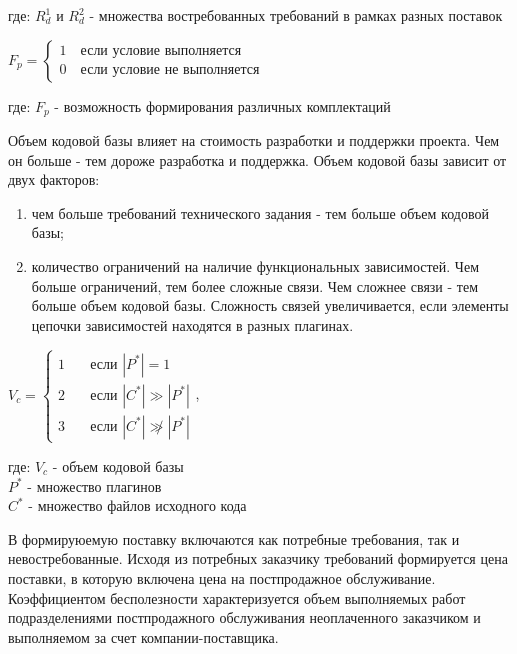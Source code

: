 \documentclass{article}
\begin{document}
\begin{enumerate}
        где: $R^1_{d}$ и $R^2_{d}$ - множества востребованных требований в рамках разных поставок

        \begin{center}
            $F_{p} = 
            \begin{cases}
                1 \quad \text{если условие выполняется}\\
                0 \quad \text{если условие не выполняется}
            \end{cases}
            $
        \end{center}

        где: $F_{p}$ - возможность формирования различных комплектаций 

        Объем кодовой базы влияет на стоимость разработки и поддержки проекта. Чем он больше - тем дороже разработка и поддержка. Объем кодовой базы зависит от двух факторов:
        \begin{enumerate}
            \item чем больше требований технического задания - тем больше объем кодовой базы;
            \item количество ограничений на наличие функциональных зависимостей. Чем больше ограничений, тем более сложные связи. Чем сложнее связи - тем больше объем кодовой базы. Сложность связей увеличивается, если элементы цепочки зависимостей находятся в разных плагинах.
        \end{enumerate}

        \begin{center}
            $V_{c} = 
            \begin{cases}
                1 & \quad \text{если } |P^*| = 1\\
                2 & \quad \text{если } |C^*| \gg |P^*|\\
                3 & \quad \text{если } |C^*| \not \gg |P^*|
            \end{cases}
            $,
        \end{center}

        где: $V_{c}$ - объем кодовой базы\\
        $P^*$ - множество плагинов\\
        $C^*$ - множество файлов исходного кода

        В формируюемую поставку включаются как потребные требования, так и невостребованные. Исходя из потребных заказчику требований формируется цена поставки, в которую включена цена на постпродажное обслуживание. Коэффициентом бесполезности характеризуется объем выполняемых работ подразделениями постпродажного обслуживания неоплаченного заказчиком и выполняемом за счет компании-поставщика.


\end{enumerate}
\end{document}
